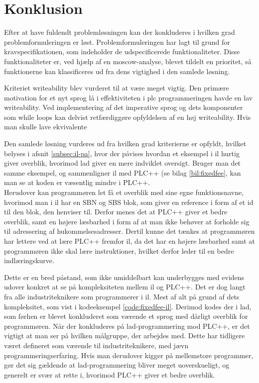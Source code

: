 \chapter{Konklusion}
\label{sec:konklusion}

Efter at have fuldendt problemløsningen kan der konkluderes i hvilken grad problemformuleringen er løst. Problemformuleringen har lagt til grund for kravspecifikationen, som indeholder de udspecificerede funktionaliteter. Disse funktionaliteter er, ved hjælp af en \gls{moscow}-analyse, blevet tildelt en prioritet, så funktionerne kan klassificeres ud fra dens vigtighed i den samlede løsning.



Kriteriet writeability blev vurderet til at være meget vigtig. Den primære motivation for et nyt sprog lå i effektiviteten i plc programmeringen havde en lav writeability. Ved implementering af det imperative sprog og dets komponenter som while loops kan delvist retfærdiggøre opfyldelsen af en høj writeability. Hvis man skulle lave ekvivalente 




Den samlede løsning vurderes ud fra hvilken grad kriterierne er opfyldt, hvilket belyses i afsnit \ref{subsec:il-pa}, hvor der påvises hvordan et eksempel i \gls{il} hurtig giver overblik, hvorimod \gls{lad} giver en mere indviklet oversigt. Bruger man det samme eksempel, og sammenligner \gls{il} med PLC++ (se bilag \ref{bil:fixedfee}, kan man se at koden er væsentlig mindre i PLC++.\\


\noindent Herudover kan programmøren let få et overblik med sine egne funktionsnavne, hvorimod man i \gls{il} har en SBN og SBS blok, som giver en reference i form af et id til den blok, den henviser til.
Derfor menes det at PLC++ giver et bedre overblik, samt en højere læsbarhed i form af at man ikke behøver at forholde sig til adressering af hukommelsesadresser.
Dertil kunne det tænkes at programmøren har lettere ved at lære PLC++ fremfor \gls{il}, da det har en højere  læsbarhed samt at programmøren ikke skal lære instruktioner, hvilket derfor leder til en bedre indlæringskurve. 

Dette er en bred påstand, som ikke umiddelbart kan underbygges med evidens udover konkret at se på kompleksiteten mellem \gls{il} og PLC++.
Det er dog langt fra alle industriteknikere som programmerer i \gls{il}. Mest af alt på grund af dets kompleksitet, som vist i kodeeksempel \ref{code:fixedfee-il}.
Derimod kodes der i \gls{lad}, som førhen er blevet konkluderet som værende et sprog med dårligt overblik for programmøren.
Når der konkluderes på \gls{lad}-programmering mod PLC++, er det vigtigt at man ser på hvilken målgruppe, der arbejdes med.
Dette har tidligere været defineret som værende til industriteknikere, med jævn programmeringserfaring.
Hvis man derudover kigger på mellemstore programmer, gør det sig gældende at \gls{lad}-programmering bliver meget uoverskueligt, og generelt er svær at rette i, hvorimod PLC++ giver et bedre overblik.\\

